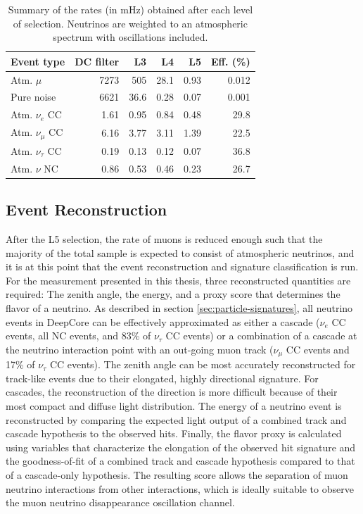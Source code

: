 \begin{table}
\begin{tabular}{lrrrrr}
Event type  & DC filter   & L3   & L4   & L5   & Eff. (\%) \\
\toprule
Atm. $\mu$         & 7273 & 505  & 28.1 & 0.93 & 0.012          \\
Pure noise         & 6621 & 36.6 & 0.28 & 0.07 & 0.001          \\
Atm. $\nu_e$ CC    & 1.61 & 0.95 & 0.84 & 0.48 & 29.8           \\
Atm. $\nu_\mu$ CC  & 6.16 & 3.77 & 3.11 & 1.39 & 22.5           \\
Atm. $\nu_\tau$ CC & 0.19 & 0.13 & 0.12 & 0.07 & 36.8           \\
Atm. $\nu$ NC      & 0.86 & 0.53 & 0.46 & 0.23 & 26.7  \\
\end{tabular}
\caption{Summary of the rates (in mHz) obtained after each level of selection. Neutrinos are weighted to an atmospheric spectrum with oscillations included.}
\label{tab:l5_summary}
\end{table}

\subsection{Event Reconstruction}
\label{sec:event-reconstruction}

After the L5 selection, the rate of muons is reduced enough such that the majority of the total sample is expected to consist of atmospheric neutrinos, and it is at this point that the event reconstruction and signature classification is run. For the measurement presented in this thesis, three reconstructed quantities are required: The zenith angle, the energy, and a proxy score that determines the flavor of a neutrino. As described in section \ref{sec:particle-signatures}, all neutrino events in DeepCore can be effectively approximated as either a cascade ($\nu_e$ CC events, all NC events, and 83\% of $\nu_\tau$ CC events) or a combination of a cascade at the neutrino interaction point with an out-going muon track ($\nu_\mu$ CC events and 17\% of $\nu_\tau$ CC events). The zenith angle can be most accurately reconstructed for track-like events due to their elongated, highly directional signature. For cascades, the reconstruction of the direction is more difficult because of their most compact and diffuse light distribution. The energy of a neutrino event is reconstructed by comparing the expected light output of a combined track and cascade hypothesis to the observed hits. Finally, the flavor proxy is calculated using variables that characterize the elongation of the observed hit signature  and the goodness-of-fit of a combined track and cascade hypothesis compared to that of a cascade-only hypothesis. The resulting score allows the separation of muon neutrino interactions from other interactions, which is ideally suitable to observe the muon neutrino disappearance oscillation channel.


